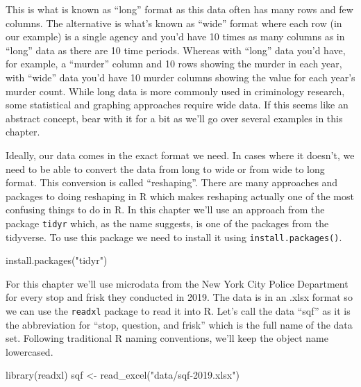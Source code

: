 \documentclass[
]{krantz}
\makeatletter
\newenvironment{Shaded}{\begin{snugshade}}{\end{snugshade}}
\newcommand{\FunctionTok}[1]{\textcolor[rgb]{0,0,0}{#1}}
\newcommand{\NormalTok}[1]{#1}
\newcommand{\OtherTok}[1]{\textcolor[rgb]{0.37,0.37,0.37}{#1}}
\newcommand{\StringTok}[1]{\textcolor[rgb]{0.5,0.5,0.5}{#1}}
\newenvironment{kframe}{%
\medskip{}
\setlength{\fboxsep}{.8em}
 \def\at@end@of@kframe{}%
 \ifinner\ifhmode%
  \def\at@end@of@kframe{\end{minipage}}%
  \begin{minipage}{\columnwidth}%
 \fi\fi%
 \def\FrameCommand##1{\hskip\@totalleftmargin \hskip-\fboxsep
 \colorbox{shadecolor}{##1}\hskip-\fboxsep
     \hskip-\linewidth \hskip-\@totalleftmargin \hskip\columnwidth}%
 \MakeFramed {\advance\hsize-\width
   \@totalleftmargin\z@ \linewidth\hsize
   \@setminipage}}%
 {\par\unskip\endMakeFramed%
 \at@end@of@kframe}
\renewenvironment{Shaded}{\begin{kframe}}{\end{kframe}}
\makeatother
\begin{document}
This is what is known as ``long'' format as this data often
has many rows and few columns. The alternative is what's
known as ``wide'' format where each row (in our example) is
a single agency and you'd have 10 times as many columns as
in ``long'' data as there are 10 time periods. Whereas with
``long'' data you'd have, for example, a ``murder'' column
and 10 rows showing the murder in each year, with ``wide''
data you'd have 10 murder columns showing the value for each
year's murder count. While long data is more commonly used
in criminology research, some statistical and graphing
approaches require wide data. If this seems like an abstract
concept, bear with it for a bit as we'll go over several
examples in this chapter.

Ideally, our data comes in the exact format we need. In
cases where it doesn't, we need to be able to convert the
data from long to wide or from wide to long format. This
conversion is called ``reshaping''. There are many
approaches and packages to doing reshaping in R which makes
reshaping actually one of the most confusing things to do in
R. In this chapter we'll use an approach from the package
\texttt{tidyr} which, as the name suggests, is one of the
packages from the tidyverse. To use this package we need to
install it using \texttt{install.packages()}.

\begin{Shaded}
\begin{Highlighting}[]
\FunctionTok{install.packages}\NormalTok{(}\StringTok{"tidyr"}\NormalTok{)}
\end{Highlighting}
\end{Shaded}

For this chapter we'll use microdata from the New York City
Police Department for every stop and frisk they conducted in
2019. The data is in an .xlsx format so we can use the
\texttt{readxl} package to read it into R. Let's call the
data ``sqf'' as it is the abbreviation for ``stop, question,
and frisk'' which is the full name of the data set.
Following traditional R naming conventions, we'll keep the
object name lowercased.

\begin{Shaded}
\begin{Highlighting}[]
\FunctionTok{library}\NormalTok{(readxl)}
\NormalTok{sqf }\OtherTok{\textless{}{-}} \FunctionTok{read\_excel}\NormalTok{(}\StringTok{"data/sqf{-}2019.xlsx"}\NormalTok{)}
\end{Highlighting}
\end{Shaded}
\end{document}

